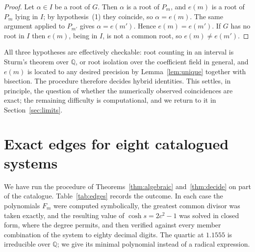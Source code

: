 \documentclass[11pt,a4paper]{article}
\theoremstyle{plain}
\theoremstyle{definition}
\theoremstyle{remark}
\newcommand{\QQ}{\mathbb{Q}}
\begin{document}
\begin{proof}
Let $\alpha\in I$ be a root of $G$. Then $\alpha$ is a root of $P_m$, and $e(m)$
is a root of $P_m$ lying in $I$; by hypothesis~(1) they coincide, so
$\alpha=e(m)$. The same argument applied to $P_{m'}$ gives $\alpha=e(m')$. Hence
$e(m)=e(m')$. If $G$ has no root in $I$ then $e(m)$, being in $I$, is not a
common root, so $e(m)\ne e(m')$.
\end{proof}

All three hypotheses are effectively checkable: root counting in an interval is
Sturm's theorem over $\QQ$, or root isolation over the coefficient field in
general, and $e(m)$ is located to any desired precision by
Lemma~\ref{lem:unique} together with bisection. The procedure therefore decides
hybrid identities. This settles, in principle, the question of whether the
numerically observed coincidences are exact; the remaining difficulty is
computational, and we return to it in Section~\ref{sec:limits}.

\section{Exact edges for eight catalogued systems}\label{sec:table}

We have run the procedure of Theorems~\ref{thm:algebraic} and~\ref{thm:decide} on
part of the catalogue. Table~\ref{tab:edges} records the outcome. In each case
the polynomials $F_m$ were computed symbolically, the greatest common divisor was
taken exactly, and the resulting value of $\cosh s=2c^{2}-1$ was solved in closed
form, where the degree permits, and then verified against every member
combination of the system to eighty decimal digits. The quartic at $1.1555$ is
irreducible over $\QQ$; we give its minimal polynomial instead of a radical
expression.
\end{document}
